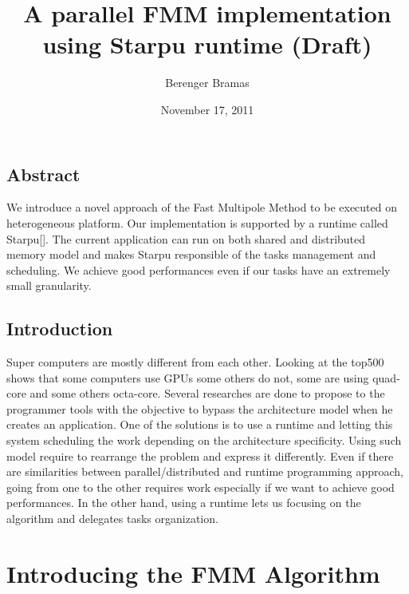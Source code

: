 \documentclass[12pt,letterpaper,titlepage]{report}
\author{Berenger Bramas}
\title{A parallel FMM implementation using Starpu runtime (Draft)}
\date{November 17, 2011}
\begin{document}
\maketitle{}
\newpage
\tableofcontents
\newpage
\section{Abstract}
We introduce a novel approach of the Fast Multipole Method to be executed on heterogeneous platform.
Our implementation is supported by a runtime called Starpu[].
The current application can run on both shared and distributed memory model and makes Starpu responsible of the tasks management and scheduling.
We achieve good performances even if our tasks have an extremely small granularity.
\section{Introduction}
Super computers are mostly different from each other.
Looking at the top500 shows that some computers use GPUs some others do not, some are using quad-core and some others octa-core.
Several researches are done to propose to the programmer tools with the objective to bypass the architecture model when he creates an application.
One of the solutions is to use a runtime and letting this system scheduling the work depending on the architecture specificity.
Using such model require to rearrange the problem and express it differently.
Even if there are similarities between parallel/distributed and runtime programming approach, going from one to the other requires work especially if we want to achieve good performances.
In the other hand, using a runtime lets us focusing on the algorithm and delegates tasks organization.
\chapter{Introducing the FMM Algorithm}
\end{document}
